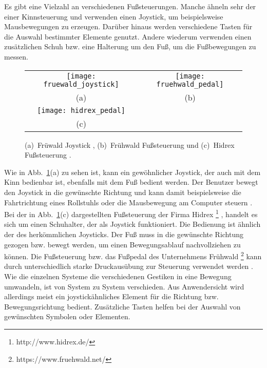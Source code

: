 Es gibt eine Vielzahl an verschiedenen Fußsteuerungen. Manche ähneln sehr der einer Kinnsteuerung und verwenden einen Joystick, um beispielsweise Mausbewegungen zu erzeugen. Darüber hinaus werden verschiedene Tasten für die Auswahl bestimmter Elemente genutzt. Andere wiederum verwenden einen zusätzlichen Schuh bzw. eine Halterung um den Fuß, um die Fußbewegungen zu messen.
%
%
\begin{figure}
\centering\small
\setlength{\tabcolsep}{0mm}	%
\begin{tabular}{c@{\hspace{0mm}}c} %
  \texttt{[image: fruewald\_joystick]} &
  \texttt{[image: fruehwald\_pedal]}
\\
  (a) & (b)
\\[7pt]	%
  \texttt{[image: hidrex\_pedal]}
\\
  (c)
\end{tabular}
%
\caption{(a)~Früwald Joystick \cite{FRUEHWALD}, (b)~Frühwald Fußsteuerung \cite{FRUEHWALD} und (c)~Hidrex Fußsteuerung \cite{HIDREX}.}
\label{fig:foot}
\end{figure}
%
%
\newline
Wie in Abb.~\ref{fig:foot}(a) zu sehen ist, kann ein gewöhnlicher Joystick, der auch mit dem Kinn bedienbar ist, ebenfalls mit dem Fuß bedient werden. Der Benutzer bewegt den Joystick in die gewünschte Richtung und kann damit beispielsweise die Fahrtrichtung eines Rollstuhls oder die Mausbewegung am Computer steuern \cite{FRUEHWALD}. 
Bei der in Abb.~\ref{fig:foot}(c) dargestellten Fußsteuerung der Firma Hidrex %
\footnote{http://www.hidrex.de/}%
, handelt es sich um einen Schuhalter, der als Joystick funktioniert. Die Bedienung ist ähnlich der des herkömmlichen Joysticks. Der Fuß muss in die gewünschte Richtung gezogen bzw. bewegt werden, um einen Bewegungsablauf nachvollziehen zu können.
Die Fußsteuerung bzw. das Fußpedal des Unternehmens Frühwald%
\footnote{https://www.fruehwald.net/}
%
kann durch unterschiedlich starke Druckausübung zur Steuerung verwendet werden \cite{FRUEHWALD}. 
%
\newline \newline
Wie die einzelnen Systeme die verschiedenen Gestiken in eine Bewegung umwandeln, ist von System zu System verschieden. Aus Anwendersicht wird allerdings meist ein joystickähnliches Element für die Richtung bzw. Bewegungsrichtung bedient. Zusätzliche Tasten helfen bei der Auswahl von gewünschten Symbolen oder Elementen.

